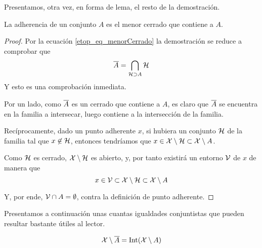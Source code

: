 Presentamos, otra vez, en forma de lema, el resto de la demostración.
\begin{lem}
	\label{etop_lem_caracterizacionAdherencia}
	La adherencia de un conjunto $A$ es el menor cerrado que contiene a $A$.
\end{lem}
\begin{proof}
	Por la ecuación \eqref{etop_eq_menorCerrado} la demostración se reduce a comprobar que
	\begin{equation*}
		\overline{A}=\bigcap_{\mathcal{H}\supset A}\mathcal{H}
	\end{equation*}
	Y esto es una comprobación inmediata.
	
	Por un lado, como $\overline{A}$ es un cerrado que contiene a $A$, es claro que $\overline{A}$ se encuentra en la familia a intersecar, luego contiene a la intersección de la familia.
	
	Recíprocamente, dado un punto adherente $x$, si hubiera un conjunto $\mathcal{H}$ de la familia tal que $x\not\in \mathcal{H}$, entonces tendríamos que $x\in\mathcal{X}\setminus\mathcal{H}\subset\mathcal{X}\setminus A$.
	
	Como $\mathcal{H}$ es cerrado, $\mathcal{X}\setminus\mathcal{H}$ es abierto, y, por tanto existirá un entorno $\mathcal{V}$ de $x$ de manera que \begin{equation*}
		x\in\mathcal{V}\subset\mathcal{X}\setminus\mathcal{H}\subset\mathcal{X}\setminus A
	\end{equation*}
	
	Y, por ende, $\mathcal{V}\cap A=\emptyset$, contra la definición de punto adherente.
\end{proof}
Presentamos a continuación unas cuantas igualdades conjuntistas que pueden resultar bastante útiles al lector.
\begin{prop}
	\label{etop_prop_compAdher}
	\begin{equation*}
		\mathcal{X}\setminus\overline{A}=\operatorname{\mathrm{Int}}(\mathcal{X}\setminus A)
	\end{equation*}
\end{prop}
